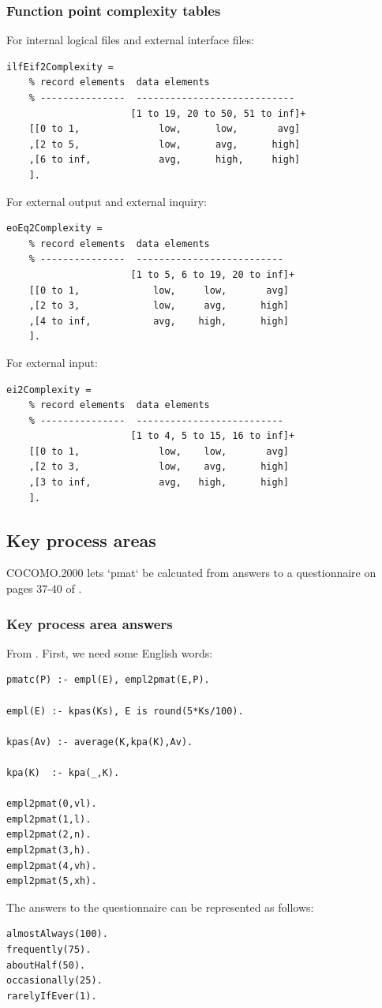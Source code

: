 \documentclass[twocolumn,global]{svjour}
\begin{document}
{\subsubsection{ Function point complexity tables
}
 For internal logical files and external interface files:
\begin{Verbatim}
ilfEif2Complexity =
    % record elements  data elements
    % ---------------  ----------------------------
                      [1 to 19, 20 to 50, 51 to inf]+
    [[0 to 1,              low,      low,       avg]
    ,[2 to 5,              low,      avg,      high]
    ,[6 to inf,            avg,      high,     high]
    ].
\end{Verbatim}
 For external output and external inquiry:
\begin{Verbatim}
eoEq2Complexity =
    % record elements  data elements
    % ---------------  --------------------------
                      [1 to 5, 6 to 19, 20 to inf]+
    [[0 to 1,             low,     low,       avg]
    ,[2 to 3,             low,     avg,      high]
    ,[4 to inf,           avg,    high,      high]
    ].
\end{Verbatim}
 For external input:  \begin{Verbatim}
ei2Complexity =
    % record elements  data elements
    % ---------------  --------------------------
                      [1 to 4, 5 to 15, 16 to inf]+
    [[0 to 1,              low,    low,       avg]
    ,[2 to 3,              low,    avg,      high]
    ,[3 to inf,            avg,   high,      high]
    ].
\end{Verbatim}
\subsection{ Key process areas
}
 COCOMO.2000 lets `pmat`
be calcuated from answers to a questionnaire on pages 37-40 of
\cite{boehm00b}.
\subsubsection{ Key process area answers
}
 From \cite[p34-36]{boehm00b}. First, we need some English words:
\begin{Verbatim}
pmatc(P) :- empl(E), empl2pmat(E,P).

empl(E) :- kpas(Ks), E is round(5*Ks/100).

kpas(Av) :- average(K,kpa(K),Av).

kpa(K)  :- kpa(_,K).

empl2pmat(0,vl).
empl2pmat(1,l).
empl2pmat(2,n).
empl2pmat(3,h).
empl2pmat(4,vh).
empl2pmat(5,xh).
\end{Verbatim}
 The answers to the questionnaire can be represented as follows: \begin{Verbatim}
almostAlways(100).
frequently(75).
aboutHalf(50).
occasionally(25).
rarelyIfEver(1).


\end{Verbatim}}
\end{document}
